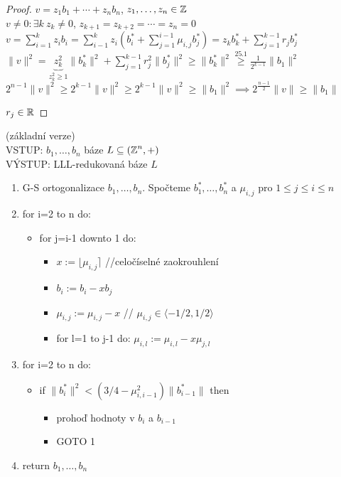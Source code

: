 \begin{proof}
$v=z_1 b_1+\cdots+z_n b_n$, $z_1,\ldots,z_n\in\operatorname{\mathbb{Z}}$\\
$v\neq 0 : \exists k\ z_k\neq0$, $z_{k+1}=z_{k+2}=\cdots=z_n=0$\\
$v=\sum_{i=1}^k z_i b_i=\sum_{i-1}^k z_i(b_i^*+\sum_{j=1}^{i-1}\mu_{i,j}b_j^*)=z_k b_k^* + \sum_{j=1}^{k-1}r_j b_j^*$\\
$\|v\|^2=\underbrace{z_k^2}_{z_k^2\geq 1} \|b_k^*\|^2+\sum_{j=1}^{k-1} r_j^2\|b_j^*\|^2\geq \|b_k^*\|^2\overset{25.1}{\geq} \frac{1}{2^{k-1}}\|b_1\|^2$\\
$2^{n-1}\|v\|^2\geq 2^{k-1}\|v\|^2\geq 2^{k-1}\|v\|^2\geq\|b_1\|^2
\implies 2^{\frac{n-1}{2}}\|v\|\geq\|b_1\|$

$r_j\in\operatorname{\mathbb{R}}$

\end{proof}

\begin{definition}
(základní verze)\\
VSTUP: $b_1,\ldots,b_n$ báze $L\subseteq(\operatorname{\mathbb{Z}}^n,+)$\\
VÝSTUP: LLL-redukovaná báze $L$

\begin{enumerate}
    \item G-S ortogonalizace $b_1, \ldots ,b_n$. Spočteme $b_1^*,\ldots ,b_n^*$ a $\mu_{i,j}$ pro $1\leq j \leq i \leq n$
    \item for i=2 to n do:\begin{itemize}
        \item for j=i-1 downto 1 do: \begin{itemize}
            \item $x:=\lfloor\mu_{i,j}\rceil$ //celočíselné zaokrouhlení
            \item $b_i:=b_i-xb_j$
            \item $\mu_{i,j}:=\mu_{i,j}-x$ // $\mu_{i,j}\in \langle -1/2, 1/2 \rangle$
            \item for l=1 to j-1 do: $\mu_{i,l}:=\mu_{i,l}-x\mu_{j,l}$
        \end{itemize}
    \end{itemize}
    \item for i=2 to n do:\begin{itemize}
        \item if $\|b_i^*\|^2<(3/4 - \mu_{i,i-1}^2)\|b_{i-1}^*\|$ then \begin{itemize}
            \item prohoď hodnoty v $b_i$ a $b_{i-1}$
            \item GOTO 1
        \end{itemize}
    \end{itemize}
    \item return $b_1,\ldots,b_n$
\end{enumerate}
\end{definition}

